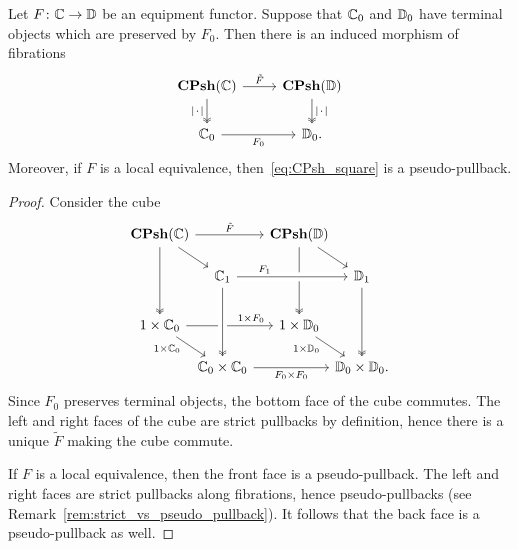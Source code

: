 \documentclass[11pt,oneside,article]{memoir}
\begin{document}
\begin{lemma}
    \label{lem:Psh_pullback}
  Let $F\colon\mathbb{C}\to\mathbb{D}$ be an equipment functor. Suppose that $\mathbb{C}_0$ and
  $\mathbb{D}_0$ have terminal objects which are preserved by $F_0$. Then there is an induced morphism
  of fibrations
  \begin{equation} \begin{tikzcd}
      \label{eq:CPsh_square}
    \CPsh(\dcat{C}) \ar[r,"\tilde{F}"] \ar[d,two heads,"\MOb"'] %
      & \CPsh(\dcat{D}) \ar[d,two heads,"\MOb"] \\
    \dcat{C}_0 \ar[r,"F_0"']
      & \dcat{D}_0.
  \end{tikzcd} \end{equation}
  Moreover, if $F$ is a local equivalence, then~\eqref{eq:CPsh_square} is a pseudo-pullback.
\end{lemma}
\begin{proof}
  Consider the cube
  \[ \begin{tikzcd}[row sep={35,between origins}, column sep={55,between origins}]
    \CPsh(\dcat{C}) \ar[rr,"\tilde{F}"] \ar[dr] \ar[dd,two heads]
      &[-10] & \CPsh(\dcat{D}) \ar[dd,two heads] \ar[dr] &[-10] \\[-5]
    & \dcat{C}_1 \ar[rr,crossing over,"F_1" near start]
      && \dcat{D}_1 \ar[dd,two heads] \\
    1\times\dcat{C}_0 \ar[rr,"1\times F_0" pos=.75]
        \ar[dr,"1\times\dcat{C}_0"' {pos=.25,inner sep=2pt}]
      && 1\times\dcat{D}_0 \ar[dr,"1\times\dcat{D}_0"' {pos=.25,inner sep=2pt}] & \\[-5]
    & \dcat{C}_0\times\dcat{C}_0 \ar[rr,"F_0\times F_0"']
        \ar[from=uu,crossing over,two heads]
      && \dcat{D}_0\times\dcat{D}_0.
  \end{tikzcd} \]
  Since $F_0$ preserves terminal objects, the bottom face of the cube commutes. The left and right
  faces of the cube are strict pullbacks by definition, hence there is a unique $\tilde{F}$ making
  the cube commute.

  If $F$ is a local equivalence, then the front face is a pseudo-pullback. The left and right faces
  are strict pullbacks along fibrations, hence pseudo-pullbacks (see
  Remark~\ref{rem:strict_vs_pseudo_pullback}). It follows that the back face is a pseudo-pullback as
  well.
\end{proof}

\end{document}
